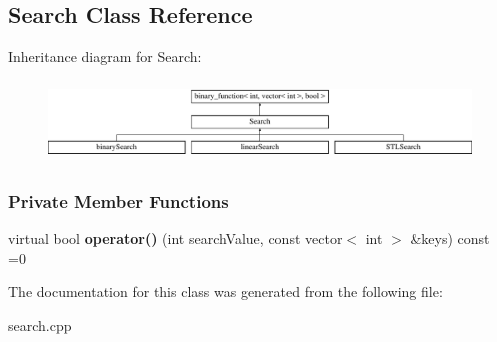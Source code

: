 \hypertarget{class_search}{}\subsection{Search Class Reference}
\label{class_search}
Inheritance diagram for Search\+:\begin{figure}[H]
\begin{center}
\leavevmode
\includegraphics[height=2.153846cm]{class_search}
\end{center}
\end{figure}
\subsubsection*{Private Member Functions}
\begin{DoxyCompactItemize}
\item 
virtual bool {\bfseries operator()} (int search\+Value, const vector$<$ int $>$ \&keys) const =0\hypertarget{class_search_a3aef7c0a6c68824120046ae7ca8f8d48}{}\label{class_search_a3aef7c0a6c68824120046ae7ca8f8d48}

\end{DoxyCompactItemize}


The documentation for this class was generated from the following file\+:\begin{DoxyCompactItemize}
\item 
search.\+cpp\end{DoxyCompactItemize}
